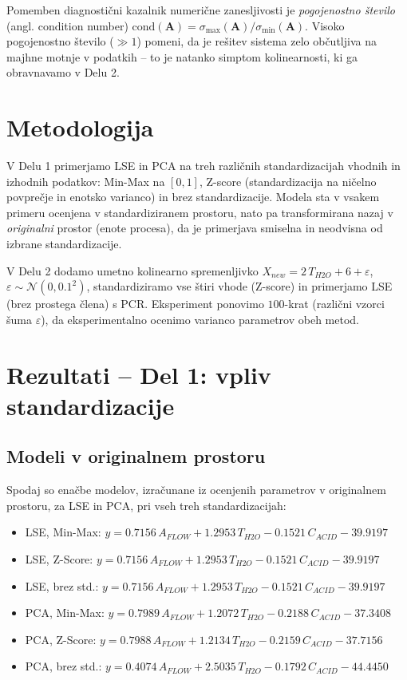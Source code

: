 \documentclass[a4paper, 11pt]{article}
\begin{document}
Pomemben diagnostični kazalnik numerične zanesljivosti je \emph{pogojenostno število}
(angl. condition number) $\mathrm{cond}(\mathbf{A}) = \sigma_{\max}(\mathbf{A})/\sigma_{\min}(\mathbf{A})$.
Visoko pogojenostno število ($\gg 1$) pomeni, da je rešitev sistema zelo občutljiva na
majhne motnje v podatkih -- to je natanko simptom kolinearnosti, ki ga obravnavamo v
Delu 2.

\section{Metodologija}

V Delu 1 primerjamo LSE in PCA na treh različnih standardizacijah vhodnih in izhodnih
podatkov: Min-Max na $[0,1]$, Z-score (standardizacija na ničelno povprečje in enotsko
varianco) in brez standardizacije. Modela sta v vsakem primeru ocenjena v
standardiziranem prostoru, nato pa transformirana nazaj v \emph{originalni} prostor
(enote procesa), da je primerjava smiselna in neodvisna od izbrane standardizacije.

V Delu 2 dodamo umetno kolinearno spremenljivko $X_{new} = 2\,T_{H2O} + 6 + \varepsilon$,
$\varepsilon \sim \mathcal{N}(0, 0.1^2)$, standardiziramo vse štiri vhode (Z-score) in
primerjamo LSE (brez prostega člena) s PCR. Eksperiment ponovimo $100$-krat (različni
vzorci šuma $\varepsilon$), da eksperimentalno ocenimo varianco parametrov obeh metod.

\section{Rezultati -- Del 1: vpliv standardizacije}

\subsection{Modeli v originalnem prostoru}

Spodaj so enačbe modelov, izračunane iz ocenjenih parametrov v originalnem prostoru, za
LSE in PCA, pri vseh treh standardizacijah:

\begin{itemize}
    \setlength\itemsep{2pt}
    \item[] LSE, Min-Max: $y = 0.7156\,A_{FLOW} + 1.2953\,T_{H2O} - 0.1521\,C_{ACID} - 39.9197$
    \item[] LSE, Z-Score: $y = 0.7156\,A_{FLOW} + 1.2953\,T_{H2O} - 0.1521\,C_{ACID} - 39.9197$
    \item[] LSE, brez std.: $y = 0.7156\,A_{FLOW} + 1.2953\,T_{H2O} - 0.1521\,C_{ACID} - 39.9197$
    \item[] PCA, Min-Max: $y = 0.7989\,A_{FLOW} + 1.2072\,T_{H2O} - 0.2188\,C_{ACID} - 37.3408$
    \item[] PCA, Z-Score: $y = 0.7988\,A_{FLOW} + 1.2134\,T_{H2O} - 0.2159\,C_{ACID} - 37.7156$
    \item[] PCA, brez std.: $y = 0.4074\,A_{FLOW} + 2.5035\,T_{H2O} - 0.1792\,C_{ACID} - 44.4450$
\end{itemize}
\end{document}
